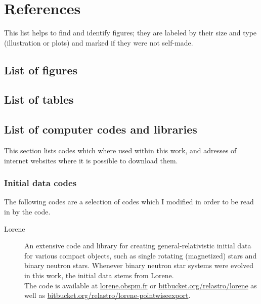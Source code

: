 \chapter{References}
\setcounter{section}{0} %
%

This list helps to find and identify figures; they are labeled by their size 
and type (illustration or plots) and marked if they were not self-made.

\begin{fullwidth} %
\section{List of figures}\label{sec:lists}
{\makeatletter
	\renewcommand*{\addvspace}[1]{}
	\makeatother }

\newpage %
\section{List of tables}

{\makeatletter
	\renewcommand*{\addvspace}[1]{}
	\makeatother}

\section{List of computer codes and libraries}\label{apx.codes}
This section lists codes which where used within this work, and adresses of internet websites where
it is possible to download them.

\subsection{Initial data codes}
The following codes are a selection of codes which I modified in order to
be read in by the  code.

\begin{description}
	\item[Lorene] An extensive code and library for creating
      general-relativistic initial data for various compact objects, such as
      single rotating (magnetized) stars and binary neutron stars. Whenever
      binary neutron star systems were evolved in this work, the initial data
      stems from Lorene. \\ The code is available at
      \href{https://lorene.obspm.fr/}{lorene.obspm.fr} or
      \href{https://bitbucket.org/relastro/lorene}{bitbucket.org/relastro/lorene}
      as well as
      \href{https://bitbucket.org/relastro/lorene-pointwiseexport}{bitbucket.org/relastro/lorene-pointwiseexport}.
     

\end{description}
\end{fullwidth}
